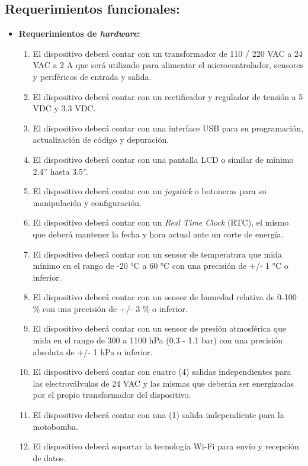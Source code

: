 \subsection{Requerimientos funcionales:}
	\begin{itemize}
		\item \textbf{Requerimientos de \textit{hardware}:}
			\begin{enumerate}
				\item El dispositivo deberá contar con un transformador de 110 / 220 VAC a 24 VAC a 2 A que será utilizado para alimentar el microcontrolador, sensores y periféricos de entrada y salida.
				\item El dispositivo deberá contar con un rectificador y regulador de tensión a 5 VDC y 3.3 VDC.
				\item El dispositivo deberá contar con una interface USB para su programación, actualización de código y depuración.
				\item El dispositivo deberá contar con una pantalla LCD o similar de mínimo 2.4'' hasta 3.5''.
				\item El dispositivo deberá contar con un \textit{joystick} o botoneras para su manipulación y configuración.
				\item El dispositivo deberá contar con un \textit{Real Time Clock} (RTC), el mismo que deberá mantener la fecha y hora actual ante un corte de energía.
				\item El dispositivo deberá contar con un sensor de temperatura que mida mínimo en el rango de -20 °C a 60 °C con una precisión de +/- 1 °C o inferior.
				\item El dispositivo deberá contar con un sensor de humedad relativa de 0-100 \% con una precisión de +/- 3 \% o inferior.
				\item El dispositivo deberá contar con un sensor de presión atmosférica que mida en el rango de 300 a 1100 hPa (0.3 - 1.1 bar) con una precisión absoluta de +/- 1 hPa o inferior.
				\item El dispositivo deberá contar con cuatro (4) salidas independientes para las electroválvulas de 24 VAC y las mismas que deberán ser energizadas por el propio transformador del dispositivo.
				\item El dispositivo deberá contar con una (1) salida independiente para la motobomba.
				\item El dispositivo deberá soportar la tecnología Wi-Fi para envío y recepción de datos.	
			\end{enumerate}
			

\end{itemize}
